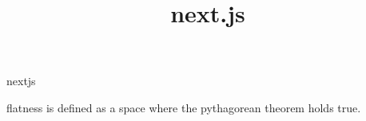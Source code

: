\documentclass{article}
\title{next.js}
\newenvironment{andrew_section}[1]
    {
    \section{#1}
    \begin{itemize}
    }
    {
    \end{itemize}
    }
\begin{document}
\maketitle





\begin{andrew_section}{nextjs}
    \item flatness is defined as a space where the pythagorean theorem holds true.
\end{andrew_section}
\end{document}
